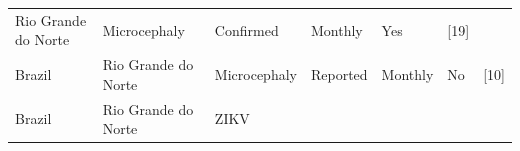 \documentclass[10pt,letterpaper]{article}
\begin{document}
\begin{longtable}[]{@{}lllllll@{}}
\begin{minipage}[t]{0.37\columnwidth}
Rio Grande do Norte\strut
\end{minipage} & \begin{minipage}[t]{0.08\columnwidth}\raggedright\strut
Microcephaly\strut
\end{minipage} & \begin{minipage}[t]{0.17\columnwidth}\raggedright\strut
Confirmed\strut
\end{minipage} & \begin{minipage}[t]{0.04\columnwidth}\raggedright\strut
Monthly\strut
\end{minipage} & \begin{minipage}[t]{0.04\columnwidth}\raggedright\strut
Yes\strut
\end{minipage} & \begin{minipage}[t]{0.08\columnwidth}\raggedright\strut
{[}19{]}\strut
\end{minipage}\tabularnewline
\begin{minipage}[t]{0.03\columnwidth}\raggedright\strut
Brazil\strut
\end{minipage} & \begin{minipage}[t]{0.37\columnwidth}\raggedright\strut
Rio Grande do Norte\strut
\end{minipage} & \begin{minipage}[t]{0.08\columnwidth}\raggedright\strut
Microcephaly\strut
\end{minipage} & \begin{minipage}[t]{0.17\columnwidth}\raggedright\strut
Reported\strut
\end{minipage} & \begin{minipage}[t]{0.04\columnwidth}\raggedright\strut
Monthly\strut
\end{minipage} & \begin{minipage}[t]{0.04\columnwidth}\raggedright\strut
No\strut
\end{minipage} & \begin{minipage}[t]{0.08\columnwidth}\raggedright\strut
{[}10{]}\strut
\end{minipage}\tabularnewline
\begin{minipage}[t]{0.03\columnwidth}\raggedright\strut
Brazil\strut
\end{minipage} & \begin{minipage}[t]{0.37\columnwidth}\raggedright\strut
Rio Grande do Norte\strut
\end{minipage} & \begin{minipage}[t]{0.08\columnwidth}\raggedright\strut
ZIKV\strut
\end{minipage} & \begin{minipage}[t]{0.17\columnwidth}\raggedright\strut

\end{minipage}
\end{longtable}
\end{document}
